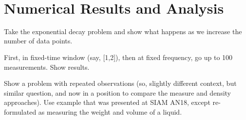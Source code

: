 \
\section{Numerical Results and Analysis}

Take the exponential decay problem and show what happens as we increase the number of data points.

First, in fixed-time window (say, [1,2]), then at fixed frequency, go up to 100 measurements. Show results.

Show a problem with repeated observations (so, slightly different context, but similar question, and now in a position to compare the measure and density approaches). Use example that was presented at SIAM AN18, except re-formulated as measuring the weight and volume of a liquid. 